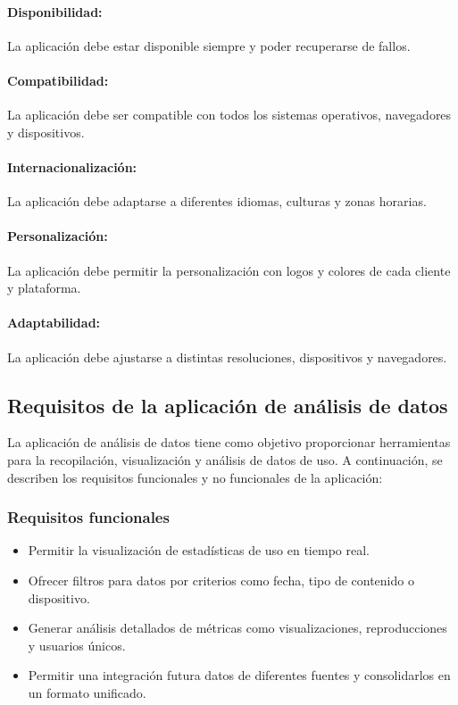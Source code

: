 \paragraph{Disponibilidad:} La aplicación debe estar disponible siempre y poder recuperarse de fallos.

\paragraph{Compatibilidad:} La aplicación debe ser compatible con todos los sistemas operativos, navegadores y dispositivos.

\paragraph{Internacionalización:} La aplicación debe adaptarse a diferentes idiomas, culturas y zonas horarias.

\paragraph{Personalización:} La aplicación debe permitir la personalización con logos y colores de cada cliente y plataforma.

\paragraph{Adaptabilidad:} La aplicación debe ajustarse a distintas resoluciones, dispositivos y navegadores.



\subsection{Requisitos de la aplicación de análisis de datos}
\label{subsec:analisis_requisitos_aplicacion_analisis}

La aplicación de análisis de datos tiene como objetivo proporcionar herramientas para la recopilación, 
visualización y análisis de datos de uso. A continuación, se describen los requisitos funcionales y no funcionales 
de la aplicación:

\subsubsection{Requisitos funcionales}
\label{subsubsec:analisis_requisitos_analisis_funcionales}

\begin{itemize}
    \item Permitir la visualización de estadísticas de uso en tiempo real.
    \item Ofrecer filtros para datos por criterios como fecha, tipo de contenido o dispositivo.
    \item Generar análisis detallados de métricas como visualizaciones, reproducciones y usuarios únicos.
    \item Permitir una integración futura datos de diferentes fuentes y consolidarlos en un formato unificado.
\end{itemize}

